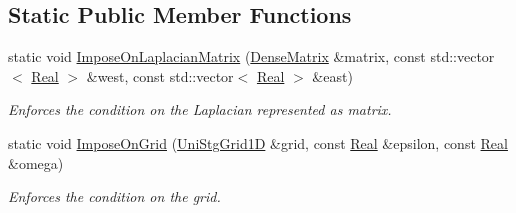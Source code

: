 \subsection*{Static Public Member Functions}
\begin{DoxyCompactItemize}
\item 
static void \hyperlink{classmtk_1_1BCDescriptor1D_a33e51235eaa930e4470f027001a023cf}{Impose\+On\+Laplacian\+Matrix} (\hyperlink{classmtk_1_1DenseMatrix}{Dense\+Matrix} \&matrix, const std\+::vector$<$ \hyperlink{group__c01-roots_gac080bbbf5cbb5502c9f00405f894857d}{Real} $>$ \&west, const std\+::vector$<$ \hyperlink{group__c01-roots_gac080bbbf5cbb5502c9f00405f894857d}{Real} $>$ \&east)
\begin{DoxyCompactList}\small\item\em Enforces the condition on the Laplacian represented as matrix. \end{DoxyCompactList}\item 
static void \hyperlink{classmtk_1_1BCDescriptor1D_adfb101c1a12b452f83dacd207febea0a}{Impose\+On\+Grid} (\hyperlink{classmtk_1_1UniStgGrid1D}{Uni\+Stg\+Grid1\+D} \&grid, const \hyperlink{group__c01-roots_gac080bbbf5cbb5502c9f00405f894857d}{Real} \&epsilon, const \hyperlink{group__c01-roots_gac080bbbf5cbb5502c9f00405f894857d}{Real} \&omega)
\begin{DoxyCompactList}\small\item\em Enforces the condition on the grid. \end{DoxyCompactList}\end{DoxyCompactItemize}
